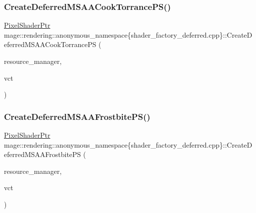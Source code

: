\subsubsection{\texorpdfstring{Create\+Deferred\+M\+S\+A\+A\+Cook\+Torrance\+P\+S()}{CreateDeferredMSAACookTorrancePS()}}
{\footnotesize\ttfamily \mbox{\hyperlink{namespacemage_1_1rendering_af03d922b228ee9c8542baaa2ecc9f259}{Pixel\+Shader\+Ptr}} mage\+::rendering\+::anonymous\+\_\+namespace\{shader\+\_\+factory\+\_\+deferred.\+cpp\}\+::Create\+Deferred\+M\+S\+A\+A\+Cook\+Torrance\+PS (\begin{DoxyParamCaption}\item[{\mbox{\hyperlink{classmage_1_1rendering_1_1_resource_manager}{Resource\+Manager}} \&}]{resource\+\_\+manager,  }\item[{bool}]{vct }\end{DoxyParamCaption})}

\mbox{\label{namespacemage_1_1rendering_1_1anonymous__namespace_02shader__factory__deferred_8cpp_03_a3229ac607f682f4501fe1ef504d99769}} 
\subsubsection{\texorpdfstring{Create\+Deferred\+M\+S\+A\+A\+Frostbite\+P\+S()}{CreateDeferredMSAAFrostbitePS()}}
{\footnotesize\ttfamily \mbox{\hyperlink{namespacemage_1_1rendering_af03d922b228ee9c8542baaa2ecc9f259}{Pixel\+Shader\+Ptr}} mage\+::rendering\+::anonymous\+\_\+namespace\{shader\+\_\+factory\+\_\+deferred.\+cpp\}\+::Create\+Deferred\+M\+S\+A\+A\+Frostbite\+PS (\begin{DoxyParamCaption}\item[{\mbox{\hyperlink{classmage_1_1rendering_1_1_resource_manager}{Resource\+Manager}} \&}]{resource\+\_\+manager,  }\item[{bool}]{vct }\end{DoxyParamCaption})}

